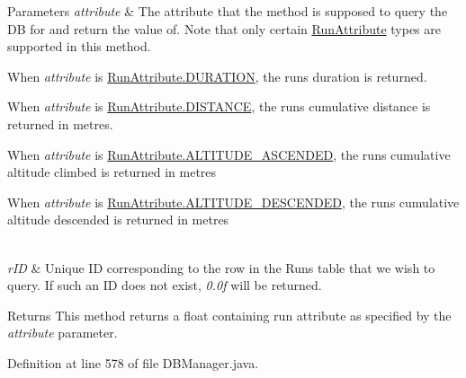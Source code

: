 \begin{DoxyParams}{Parameters}
{\em attribute} & The attribute that the method is supposed to query the DB for and return the value of. Note that only certain \mbox{\hyperlink{enumcom_1_1activitytracker_1_1_run_attribute}{Run\+Attribute}} types are supported in this method.
\begin{DoxyItemize}
\item When {\itshape attribute} is \mbox{\hyperlink{enumcom_1_1activitytracker_1_1_run_attribute_a7adf133b2a62f1f99ffc2adfb7097ec9}{Run\+Attribute.\+D\+U\+R\+A\+T\+I\+ON}}, the run\textquotesingle{}s duration is returned.
\item When {\itshape attribute} is \mbox{\hyperlink{enumcom_1_1activitytracker_1_1_run_attribute_a90ee541e68e458a0bb3f5ea45fd46ec0}{Run\+Attribute.\+D\+I\+S\+T\+A\+N\+CE}}, the run\textquotesingle{}s cumulative distance is returned in metres.
\item When {\itshape attribute} is \mbox{\hyperlink{enumcom_1_1activitytracker_1_1_run_attribute_abcfe85bf48187d67842a0525c1bcc0af}{Run\+Attribute.\+A\+L\+T\+I\+T\+U\+D\+E\+\_\+\+A\+S\+C\+E\+N\+D\+ED}}, the run\textquotesingle{}s cumulative altitude climbed is returned in metres
\item When {\itshape attribute} is \mbox{\hyperlink{enumcom_1_1activitytracker_1_1_run_attribute_a337a68867cfdb8ec7a17c318ad8b216b}{Run\+Attribute.\+A\+L\+T\+I\+T\+U\+D\+E\+\_\+\+D\+E\+S\+C\+E\+N\+D\+ED}}, the run\textquotesingle{}s cumulative altitude descended is returned in metres 
\end{DoxyItemize}\\
\hline
{\em r\+ID} & Unique ID corresponding to the row in the Runs table that we wish to query. If such an ID does not exist, {\itshape 0.\+0f} will be returned.\\
\hline
\end{DoxyParams}
\begin{DoxyReturn}{Returns}
This method returns a float containing run attribute as specified by the {\itshape attribute} parameter. 
\end{DoxyReturn}


Definition at line 578 of file D\+B\+Manager.\+java.


